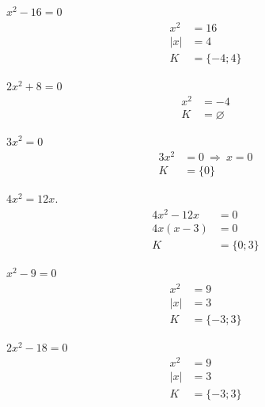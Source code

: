 \documentclass[11pt,a4paper]{article}
\begin{document}
\begin{prikladReseniBox}[title={Příklad 1}]
$x^{2} - 16=0$
\tcblower
\[
\begin{aligned}
x^2&=16\\|x|&=4\\[2pt]
K&=\{-4;4\}
\end{aligned}
\]
\end{prikladReseniBox}
\begin{prikladReseniBox}[title={Příklad 2}]
$2x^{2} + 8=0$
\tcblower
\[
\begin{aligned}
x^2&=-4\\[2pt]
K&=\varnothing
\end{aligned}
\]
\end{prikladReseniBox}
\begin{prikladReseniBox}[title={Příklad 3}]
$3x^{2}=0$
\tcblower
\[
\begin{aligned}
3x^2&=0\ \Rightarrow\ x=0\\[2pt]
K&=\{0\}
\end{aligned}
\]
\end{prikladReseniBox}
\begin{prikladReseniBox}[title={Příklad 4}]
$4x^2=12x$.
\tcblower
\[\begin{aligned}
4x^2-12x&=0\\4x(x-3)&=0\\K&=\{0;3\}
\end{aligned}\]
\end{prikladReseniBox}
\begin{zadaniReseniBox}[title={Samostatná práce 1}]
$x^{2} - 9=0$
\tcblower
\[
\begin{aligned}
x^2&=9\\|x|&=3\\[2pt]
K&=\{-3;3\}
\end{aligned}
\]
\end{zadaniReseniBox}
\begin{zadaniReseniBox}[title={Samostatná práce 2}]
$2x^{2} - 18=0$
\tcblower
\[
\begin{aligned}
x^2&=9\\|x|&=3\\[2pt]
K&=\{-3;3\}
\end{aligned}
\]
\end{zadaniReseniBox}
\end{document}
